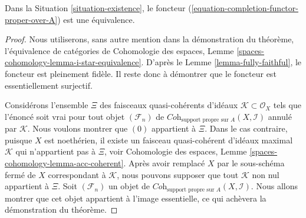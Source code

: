 \begin{theorem}
\label{theorem-grothendieck-existence}
Dans la Situation \ref{situation-existence}, le foncteur
(\ref{equation-completion-functor-proper-over-A})
est une équivalence.
\end{theorem}

\begin{proof}
Nous utiliserons, sans autre mention dans la démonstration du théorème,
l'équivalence de catégories de Cohomologie des espaces, Lemme
\ref{spaces-cohomology-lemma-i-star-equivalence}.
D'après le Lemme \ref{lemma-fully-faithful}, le foncteur est pleinement fidèle.
Il reste donc à démontrer que le foncteur est essentiellement surjectif.

\medskip\noindent
Considérons l'ensemble $\Xi$ des faisceaux quasi-cohérents d'idéaux
$\mathcal{K} \subset \mathcal{O}_X$ tels que l'énoncé soit vrai
pour tout objet $(\mathcal{F}_n)$ de
$\textit{Coh}_{\text{support propre sur }A}(X, \mathcal{I})$
annulé par $\mathcal{K}$. Nous voulons montrer que $(0)$ appartient à $\Xi$.
Dans le cas contraire, puisque $X$ est noethérien, il existe un
faisceau quasi-cohérent d'idéaux maximal $\mathcal{K}$ qui n'appartient pas à $\Xi$, voir
Cohomologie des espaces, Lemme \ref{spaces-cohomology-lemma-acc-coherent}.
Après avoir remplacé $X$ par le sous-schéma fermé de $X$
correspondant à $\mathcal{K}$, nous pouvons supposer que tout
$\mathcal{K}$ non nul appartient à $\Xi$. Soit $(\mathcal{F}_n)$ un objet de
$\textit{Coh}_{\text{support propre sur }A}(X, \mathcal{I})$.
Nous allons montrer que cet objet appartient à l'image essentielle, ce qui
achèvera la démonstration du théorème.


\end{proof}
